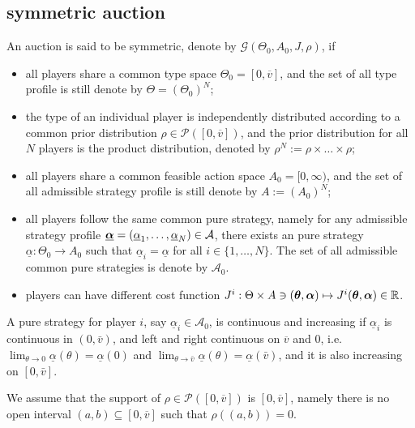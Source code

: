 
\subsection{symmetric auction}

\begin{definition}
An auction is said to be symmetric, denote by $\mathcal{G}(\Theta_0, A_0, J, \rho)$, if
\begin{itemize}
	\item all players share a common type space $\Theta_0 = [0, \overline{v}]$, and the set of all type profile is still denote by $\Theta = (\Theta_0)^N$;
	\item the type of an individual player is independently distributed according to a common prior distribution $\rho \in \mathcal{P}([0, \overline{v}])$, and the prior distribution for all $N$ players is the product distribution, denoted by $\rho^N := \rho \times \ldots \times \rho$;
	\item all players share a common feasible action space $A_0= [0, \infty)$, and the set of all admissible strategy profile is still denote by $A := (A_0)^N$;
	\item all players follow the same common pure strategy, namely for any admissible strategy profile $\underline{\boldsymbol{\alpha}}= (\underline{\alpha}_1, \ldots, \underline{\alpha}_N) \in \mathcal{A}$, there exists an pure strategy $\underline{\alpha}: \Theta_0 \to A_0$ such that $\underline{\alpha}_i = \underline{\alpha}$ for all $i \in \{1,\ldots, N\}$. The set of all admissible common pure strategies is denote by $\mathcal{A}_0$.
	\item players can have different cost function $J^i: \Theta \times A \ni (\boldsymbol{\theta}, \boldsymbol{\alpha}) \mapsto J^i(\boldsymbol{\theta}, \boldsymbol{\alpha}) \in \mathbb{R}$.
\end{itemize} 
\end{definition}


A pure strategy for player $i$, say $\underline{\alpha}_i \in \mathcal{A}_0$, is continuous and increasing if $\underline{\alpha}_i$ is continuous in $(0, \bar{v})$, and left and right continuous on $\overline{v}$ and $0$, i.e.$\lim_{\theta \to 0} \underline{\alpha}(\theta) = \underline{\alpha}(0)$ and $\lim_{\theta \to \bar{v}} \underline{\alpha}(\theta) = \underline{\alpha}(\bar{v})$, and it is also increasing on $[0,\bar{v}]$. 


\begin{assumption}
	We assume that the support of $\rho \in \mathcal{P}([0,\overline{v}])$ is $[0, \overline{v}]$, namely there is no open interval $(a,b) \subseteq [0, \overline{v}]$ such that $\rho((a,b)) =0$.
\label{assumption:Auction_symmetric_full_support}
\end{assumption}

